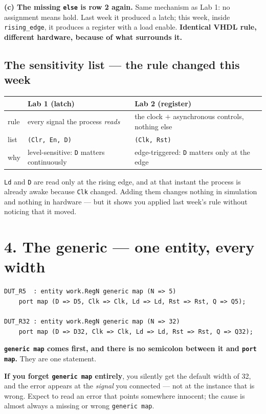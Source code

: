 \documentclass[11pt]{article}
\newcommand{\code}[1]{\texttt{#1}}
\begin{document}
\textbf{(c) The missing \code{else} is row 2 again.} Same mechanism as Lab 1: no
assignment means hold. Last week it produced a latch; this week, inside
\code{rising\_edge}, it produces a register with a load enable. \textbf{Identical
VHDL rule, different hardware, because of what surrounds it.}

\subsection*{The sensitivity list --- the rule changed this week}

\begin{center}
\begin{tabular}{lll}
\toprule
& Lab 1 (latch) & Lab 2 (register) \\
\midrule
rule & every signal the process \emph{reads} & the clock $+$ asynchronous controls, nothing else \\
list & \code{(Clr, En, D)} & \code{(Clk, Rst)} \\
why & level-sensitive: \code{D} matters continuously & edge-triggered: \code{D} matters only at the edge \\
\bottomrule
\end{tabular}
\end{center}

\code{Ld} and \code{D} are read only at the rising edge, and at that instant the
process is already awake because \code{Clk} changed. Adding them changes nothing
in simulation and nothing in hardware --- but it shows you applied last week's
rule without noticing that it moved.

\section*{4. The generic --- one entity, every width}

\begin{lstlisting}
DUT_R5  : entity work.RegN generic map (N => 5)
    port map (D => D5, Clk => Clk, Ld => Ld, Rst => Rst, Q => Q5);

DUT_R32 : entity work.RegN generic map (N => 32)
    port map (D => D32, Clk => Clk, Ld => Ld, Rst => Rst, Q => Q32);
\end{lstlisting}

\textbf{\code{generic map} comes first, and there is no semicolon between it and
\code{port map}.} They are one statement.

\textbf{If you forget \code{generic map} entirely}, you silently get the default
width of 32, and the error appears at the \emph{signal} you connected --- not at
the instance that is wrong. Expect to read an error that points somewhere
innocent; the cause is almost always a missing or wrong \code{generic map}.
\end{document}
